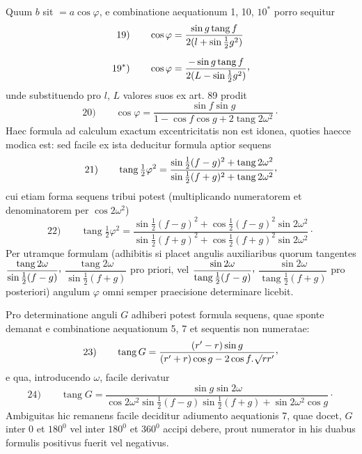 Quum $b$ sit $=a\cos\varphi$, e combinatione aequationum 1, 10, $10^{\ast}$ porro sequitur
\[
\begin{aligned}
\mathrm{19)}\qquad \cos\varphi&=\dfrac{\sin g\operatorname{tang}f}{2(l+\sin\frac12 g^2)}\\[6pt]
\mathrm{19}^{\ast}\mathrm{)}\qquad \cos\varphi&=\dfrac{-\sin g\operatorname{tang}f}{2(L-\sin\frac12 g^2)}\mathpunct{\raisebox{.45ex}{,}}
\end{aligned}
\]
unde substituendo pro $l$, $L$ valores suos ex art. 89 prodit
\[
\mathrm{20)}\qquad \cos\varphi=\dfrac{\sin f\sin g}{1-\cos f\cos g+2\operatorname{tang}2\omega^2}\mathpunct{\cdot}
\]
Haec formula ad calculum exactum excentricitatis non est idonea, quoties haecce modica est: sed facile ex ista deducitur formula aptior sequens
\[
\mathrm{21)}\qquad \operatorname{tang}\tfrac12\varphi^2=\dfrac{\sin\frac12(f-g)^2+\operatorname{tang}2\omega^2}{\sin\frac12(f+g)^2+\operatorname{tang}2\omega^2}\mathpunct{\raisebox{.45ex}{,}}
\]
cui etiam forma sequens tribui potest (multiplicando numeratorem et denominatorem per $\cos 2\omega^2$)
\[
\mathrm{22)}\qquad \operatorname{tang}\tfrac12\varphi^2=\dfrac{\sin\frac12(f-g)^2+\cos\frac12(f-g)^2\sin 2\omega^2}{\sin\frac12(f+g)^2+\cos\frac12(f+g)^2\sin 2\omega^2}\mathpunct{\cdot}
\]
Per utramque formulam (adhibitis si placet angulis auxiliaribus quorum tangentes $\dfrac{\operatorname{tang}2\omega}{\sin\frac12(f-g)}\mathpunct{\raisebox{.45ex}{,}}$ $\dfrac{\operatorname{tang}2\omega}{\sin\frac12(f+g)}$ pro priori, vel $\dfrac{\sin 2\omega}{\operatorname{tang}\frac12(f-g)}\mathpunct{\raisebox{.45ex}{,}}$ $\dfrac{\sin 2\omega}{\operatorname{tang}\frac12(f+g)}$ pro posteriori) angulum $\varphi$ omni semper praecisione determinare licebit.

Pro determinatione anguli $G$ adhiberi potest formula sequens, quae sponte demanat e combinatione aequationum 5, 7 et sequentis non numeratae:
\[
\mathrm{23)}\qquad \operatorname{tang}G=\dfrac{(r'-r)\sin g}{(r'+r)\cos g-2\cos f\mathpunct{.}\BareRoot{rr'}}\mathpunct{\raisebox{.45ex}{,}}
\]
e qua, introducendo $\omega$, facile derivatur
\[
\mathrm{24)}\qquad \operatorname{tang}G=\dfrac{\sin g\sin 2\omega}{\cos 2\omega^2\sin\frac12(f-g)\sin\frac12(f+g)+\sin 2\omega^2\cos g}\mathpunct{\cdot}
\]
Ambiguitas hic remanens facile deciditur adiumento aequationis 7, quae docet, $G$ inter 0 et $180^0$ vel inter $180^0$ et $360^0$ accipi debere, prout numerator in his duabus formulis positivus fuerit vel negativus.

